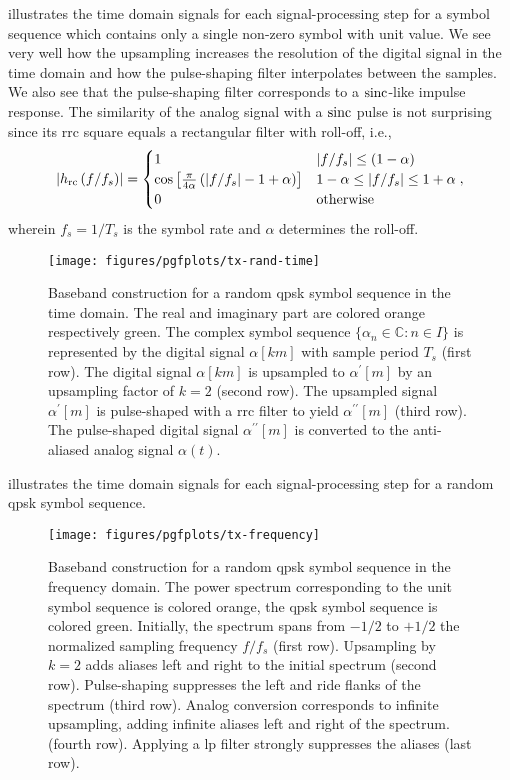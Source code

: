  illustrates the time domain signals for each signal-processing step for a symbol sequence which contains only a single non-zero symbol with unit value.
We see very well how the upsampling increases the resolution of the digital signal in the time domain and how the pulse-shaping filter interpolates between the samples.
We also see that the pulse-shaping filter corresponds to a $\sinc$-like impulse response.
The similarity of the analog signal with a $\sinc$ pulse is not surprising since its \gls{rrc} square equals a rectangular filter with roll-off, i.e.,
\begin{equation}
	\abs{h_\text{rc}\left(f/f_s\right)}
	=
	\begin{cases}
		1 & \abs*{f/f_s}\leq(1-\alpha) \\
		\cos\left[\frac{\pi}{4\alpha}\left(\abs*{f/f_s}-1+\alpha\right)\right] & 1-\alpha\leq\abs*{f/f_s}\leq1+\alpha \\
		0 & \text{otherwise}
	\end{cases}
	,
\end{equation}
wherein $f_s=1/T_s$ is the symbol rate and $\alpha$ determines the roll-off.
\begin{figure}[htb]
	\centering
	\texttt{[image: figures/pgfplots/tx-rand-time]}
	\caption{Baseband construction for a random \gls{qpsk} symbol sequence in the time domain. The real and imaginary part are colored orange respectively green. The complex symbol sequence $\{\alpha_n\in\mathbb{C}\colon n\in I\}$ is represented by the digital signal $\alpha[km]$ with sample period $T_s$ (first row). The digital signal $\alpha[km]$ is upsampled to $\alpha^\prime[m]$ by an upsampling factor of $k=2$ (second row). The upsampled signal $\alpha^\prime[m]$ is pulse-shaped with a \gls{rrc} filter to yield $\alpha^{\prime\prime}[m]$ (third row). The pulse-shaped digital signal $\alpha^{\prime\prime}[m]$ is converted to the anti-aliased analog signal $\alpha(t)$.}\label{fig:baseband_construction_rand_time}
\end{figure}
 illustrates the time domain signals for each signal-processing step for a random \gls{qpsk} symbol sequence.
\begin{figure}[htb]
	\centering
	\texttt{[image: figures/pgfplots/tx-frequency]}
	\caption{Baseband construction for a random \gls{qpsk} symbol sequence in the frequency domain. The power spectrum corresponding to the unit symbol sequence is colored orange, the \gls{qpsk} symbol sequence is colored green. Initially, the spectrum spans from $-1/2$ to $+1/2$ the normalized sampling frequency $f/f_s$ (first row). Upsampling by $k=2$ adds aliases left and right to the initial spectrum (second row). Pulse-shaping suppresses the left and ride flanks of the spectrum (third row). Analog conversion corresponds to infinite upsampling, adding infinite aliases left and right of the spectrum. (fourth row). Applying a \gls{lp} filter strongly suppresses the aliases (last row).}\label{fig:baseband_construction_freq}
\end{figure}
